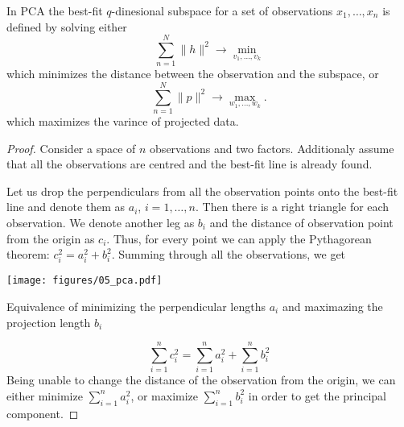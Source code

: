 \begin{theorem}
In PCA the best-fit $q$-dinesional subspace for a set of observations $x_1, \ldots, x_n$
is defined by solving either
\[
\sum_{n=1}^N \lVert h \rVert^2  \to \min_{v_1, \ldots, v_k}
\]
which minimizes the distance between the observation and the subspace, or
\[
\sum_{n=1}^N \lVert p \rVert^2  \to \max_{w_1, \ldots, w_k}.
\]
which maximizes the varince of projected data.
\end{theorem}

\begin{proof}
Consider a space of $n$ observations and two factors.
Additionaly assume that all the observations are centred and
the best-fit line is already found.

Let us drop the perpendiculars from all the observation points onto the best-fit line
and denote them as $a_i$, $i = 1, \ldots, n$.
Then there is a right triangle for each observation.
We denote another leg as $b_i$ and the distance of observation point from the origin as $c_i$.
Thus, for every point we can apply the Pythagorean theorem: $c_i^2 = a_i^2 + b_i^2$.
Summing through all the observations, we get
\begin{marginfigure}
  \texttt{[image: figures/05\_pca.pdf]}
  \caption{Equivalence of minimizing the perpendicular lengths $a_i$ and
  maximazing the projection length $b_i$}
  \label{fig:pca}
\end{marginfigure}
\[
\sum\limits_{i=1}^n c_i^2 = \sum\limits_{i=1}^n a_i^2 + \sum\limits_{i=1}^n b_i^2
\]
Being unable to change the distance of the observation from the origin,
we can either minimize $\sum_{i=1}^n a_i^2$, or maximize $\sum_{i=1}^n b_i^2$
in order to get the principal component.


\end{proof}
